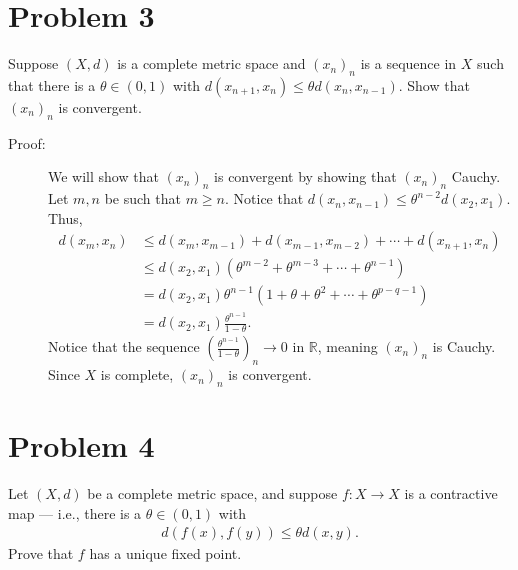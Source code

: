 \documentclass[8pt]{extarticle}
\newcommand{\R}{\mathbb{R}}
\begin{document}
  \section{Problem 3}%
  Suppose $(X,d)$ is a complete metric space and $(x_n)_n$ is a sequence in $X$ such that there is a $\theta \in (0,1)$ with $d(x_{n+1},x_n) \leq \theta d(x_n,x_{n-1})$. Show that $(x_n)_n$ is convergent.
  \begin{description}
    \item[Proof:] We will show that $(x_n)_n$ is convergent by showing that $(x_n)_n$ Cauchy. Let $m,n$ be such that $m\geq n$. Notice that $d(x_n,x_{n-1}) \leq \theta^{n-2}d(x_2,x_1)$. Thus,
      \begin{align*}
        d(x_m,x_n) &\leq d(x_m,x_{m-1}) + d(x_{m-1},x_{m-2}) + \cdots + d(x_{n+1},x_n)\\
                   &\leq d(x_2,x_1)\left(\theta^{m-2} + \theta^{m-3} + \cdots + \theta^{n-1}\right)\\
                   &= d(x_2,x_1) \theta^{n-1}\left(1 + \theta + \theta^2 + \cdots + \theta^{p-q-1}\right)\\
                   &= d(x_2,x_1)\frac{\theta^{n-1}}{1-\theta}.
      \end{align*}
      Notice that the sequence $\left(\frac{\theta^{n-1}}{1-\theta}\right)_{n}\rightarrow 0$ in $\R$, meaning $(x_n)_n$ is Cauchy. Since $X$ is complete, $(x_n)_n$ is convergent.
  \end{description}
  \section{Problem 4}%
  Let $(X,d)$ be a complete metric space, and suppose $f: X\rightarrow X$ is a contractive map --- i.e., there is a $\theta \in (0,1)$ with
  \begin{align*}
    d(f(x),f(y)) \leq \theta d(x,y).
  \end{align*}
  Prove that $f$ has a unique fixed point.
\end{document}
